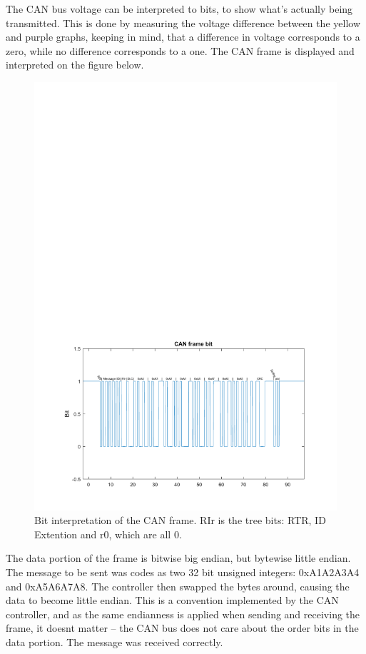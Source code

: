The CAN bus voltage can be interpreted to bits, to show what's actually being transmitted.
This is done by measuring the voltage difference between the yellow and purple graphs, keeping in mind, that a difference in voltage corresponds to a zero, while no difference corresponds to a one.
The CAN frame is displayed and interpreted on the figure below.

\begin{figure}[h]
	\centering
	\includegraphics[width = \linewidth]{graphics/CAN_test1_message}
	\caption{Bit interpretation of the CAN frame. RIr  is the tree bits: RTR, ID Extention and r0, which are all 0.}
	\label{fig:CAN_test1_message}
\end{figure}

The data portion of the frame is bitwise big endian, but bytewise little endian. 
The message to be sent was codes as two 32 bit unsigned integers: 0xA1A2A3A4 and 0xA5A6A7A8.
The controller then swapped the bytes around, causing the data to become little endian.
This is a convention implemented by the CAN controller, and as the same endianness is applied when sending and receiving the frame, it doesnt matter -- the CAN bus does not care about the order bits in the data portion. 
The message was received correctly.\\

